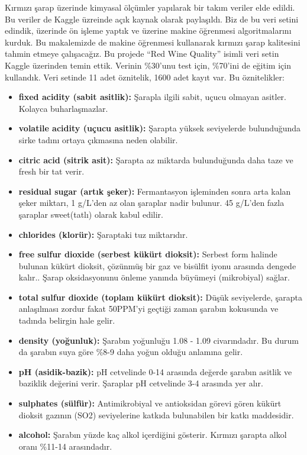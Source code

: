 \documentclass[conference]{IEEEtran}
\begin{document}
\quad Kırmızı şarap üzerinde kimyasal ölçümler yapılarak bir takım veriler elde edildi. Bu veriler de Kaggle\cite{4} üzreinde açık kaynak olarak paylaşıldı. Biz de bu veri setini edindik, üzerinde ön işleme yaptık ve üzerine makine öğrenmesi algoritmalarını kurduk. Bu makalemizde de makine öğrenmesi kullanarak kırmızı şarap kalitesini tahmin etmeye çalışacağız.
\newpage
\quad Bu projede “Red Wine Quality” isimli veri setin\cite{4} Kaggle üzerinden temin ettik. Verinin \%30’unu test için, \%70’ini de eğitim için kullandık. Veri setinde 11 adet öznitelik, 1600 adet kayıt var. Bu öznitelikler:


\begin{itemize}
  \item \textbf{fixed acidity (sabit asitlik): } Şarapla ilgili sabit, uçucu olmayan asitler. Kolayca buharlaşmazlar\cite{5}.
  \item \textbf{volatile acidity (uçucu asitlik): } Şarapta yüksek seviyelerde bulunduğunda sirke tadını ortaya çıkmasına neden olabilir\cite{5}.
  \item \textbf{citric acid (sitrik asit): } Şarapta az miktarda bulunduğunda daha taze ve fresh bir tat verir\cite{5}.
  \item \textbf{residual sugar (artık şeker): } Fermantasyon işleminden sonra arta kalan şeker miktarı, 1 g/L’den az olan şaraplar nadir bulunur. 45 g/L’den fazla şaraplar sweet(tatlı) olarak kabul edilir\cite{5}.
  \item \textbf{chlorides (klorür): } Şaraptaki tuz miktarıdır\cite{5}.
  \item \textbf{free sulfur dioxide (serbest kükürt dioksit): } Serbest form halinde bulunan kükürt dioksit, çözünmüş bir gaz ve bisülfit iyonu arasında dengede kalır.. Şarap oksidasyonunu önleme yanında büyümeyi (mikrobiyal) sağlar\cite{5}.
  \item \textbf{total sulfur dioxide (toplam kükürt dioksit): } Düşük seviyelerde, şarapta anlaşılması zordur fakat 50PPM’yi geçtiği zaman şarabın kokusunda ve tadında belirgin hale gelir\cite{5}.
  \item \textbf{density (yoğunluk): } Şarabın yoğunluğu 1.08 - 1.09 civarındadır. Bu durum da şarabın suya göre \%8-9 daha yoğun olduğu anlamına gelir\cite{6}.
  \item \textbf{pH (asidik-bazik): } pH cetvelinde 0-14 arasında değerde  şarabın asitlik ve baziklik değerini verir. Şaraplar pH cetvelinde 3-4 arasında yer alır\cite{5}.
  \item \textbf{sulphates (sülfür): } Antimikrobiyal ve antioksidan görevi gören kükürt dioksit gazının (SO2) seviyelerine katkıda bulunabilen bir katkı maddesidir\cite{5}.
  \item \textbf{alcohol: } Şarabın yüzde kaç alkol içerdiğini gösterir. Kırmızı şarapta alkol oranı \%11-14 arasındadır\cite{5}.
\end{itemize}
\end{document}
